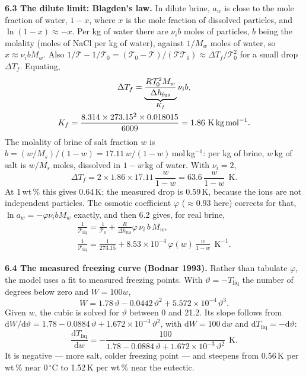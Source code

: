 \documentclass[11pt,a4paper]{article}
\newcommand{\dd}{\mathrm{d}}
\newcommand{\Tliq}{T_{\mathrm{liq}}}
\newcommand{\Tabs}{\mathcal{T}}
\newcommand{\dC}{\,{}^{\circ}\mathrm{C}}
\newcommand{\sub}[1]{\par\smallskip\noindent\textbf{#1}\enspace}
\begin{document}
\sub{6.3 The dilute limit: Blagden's law.} In dilute brine, $a_w$ is close to the mole fraction of water,
$1 - x$, where $x$ is the mole fraction of dissolved particles, and $\ln(1-x)\approx -x$. Per kg of water
there are $\nu_ib$ moles of particles, $b$ being the molality (moles of NaCl per kg of water), against
$1/M_w$ moles of water, so $x \approx \nu_ibM_w$. Also
$1/\Tabs - 1/\Tabs_0 = (\Tabs_0 - \Tabs)/(\Tabs\Tabs_0) \approx \Delta T_f/\Tabs_0^2$ for a small drop
$\Delta T_f$. Equating,
\begin{gather*}
\Delta T_f = \underbrace{\frac{R\Tabs_0^2M_w}{\Delta h_{\mathrm{fus}}}}_{K_f}\nu_i b,
\\
K_f = \frac{8.314\times273.15^2\times0.018015}{6009} = 1.86\ \text{K\,kg\,mol}^{-1}.
\end{gather*}
The molality of brine of salt fraction $w$ is $b = (w/M_s)/(1-w) = 17.11\,w/(1-w)$\,mol\,kg$^{-1}$: per kg of
brine, $w$\,kg of salt is $w/M_s$ moles, dissolved in $1-w$\,kg of water. With $\nu_i = 2$,
\[ \Delta T_f = 2\times1.86\times17.11\,\frac{w}{1-w} = 63.6\,\frac{w}{1-w}\ \ \text{K}. \]
At 1\,wt\,\% this gives 0.64\,K; the measured drop is 0.59\,K, because the ions are not independent
particles. The osmotic coefficient $\varphi$ ($\approx 0.93$ here) corrects for that, $\ln a_w = -\varphi\nu_ibM_w$
exactly, and then 6.2 gives, for real brine,
\begin{gather*}
\frac{1}{\Tabs_{\mathrm{liq}}} = \frac{1}{\Tabs_0} + \frac{R}{\Delta h_{\mathrm{fus}}}\varphi\,\nu_i\,b\,M_w ,
\\
\frac{1}{\Tabs_{\mathrm{liq}}} = \frac{1}{273.15} + 8.53\times10^{-4}\,\varphi(w)\,\frac{w}{1-w}\ \ \text{K}^{-1}.
\end{gather*}

\sub{6.4 The measured freezing curve (Bodnar 1993).} Rather than tabulate $\varphi$, the model uses a fit to
measured freezing points. With $\vartheta = -\Tliq$ the number of degrees below zero and $W = 100w$,
\[ W = 1.78\,\vartheta - 0.0442\,\vartheta^2 + 5.572\times10^{-4}\,\vartheta^3 . \]
Given $w$, the cubic is solved for $\vartheta$ between 0 and 21.2. Its slope follows from
$\dd W/\dd\vartheta = 1.78 - 0.0884\,\vartheta + 1.672\times10^{-3}\,\vartheta^2$, with $\dd W = 100\,\dd w$ and
$\dd\Tliq = -\dd\vartheta$:
\[ \frac{\dd\Tliq}{\dd w} = -\frac{100}{1.78 - 0.0884\,\vartheta + 1.672\times10^{-3}\,\vartheta^2}\ \ \text{K} . \]
It is negative --- more salt, colder freezing point --- and steepens from 0.56\,K per wt\,\% near $0\dC$ to
1.52\,K per wt\,\% near the eutectic.
\end{document}
